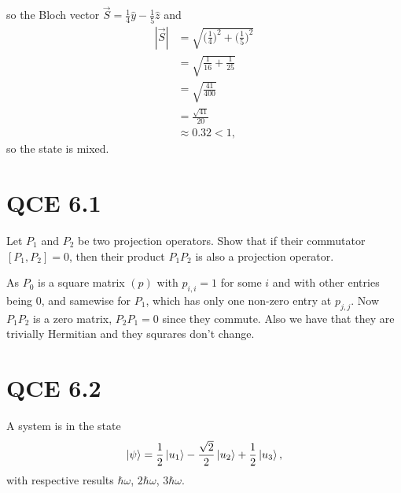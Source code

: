 \documentclass[10pt]{article}
\begin{document}
so the Bloch vector $\vec{S} = \frac{1}{4} \hat{y} - \frac{1}{5} \hat{z}$ and
\begin{align*}
|\vec{S}| &= \sqrt{\Bigg( \frac{1}{4} \Bigg)^2 + \Bigg( \frac{1}{5} \Bigg)^2} \\
              &= \sqrt{\frac{1}{16} + \frac{1}{25}} \\
              &= \sqrt{\frac{41}{400}} \\
              &= \frac{\sqrt{41}}{20} \\
              &\approx 0.32 < 1,
\end{align*}
so the state is mixed.

\section*{QCE 6.1}
Let $P_1$ and $P_2$ be two projection operators. Show that if their commutator $[P_1, P_2] = 0$, then their product $P_1 P_2$ is also a projection operator.

As $P_0$ is a square matrix $(p)$ with $p_{i, i} = 1$ for some $i$ and with other entries being 0, and samewise for $P_1$, which has only one non-zero entry at $p_{j, j}$. Now $P_1 P_2$ is a zero matrix, $P_2 P_1 = 0$ since they commute. Also we have that they are trivially Hermitian and they squrares don't change.

\section*{QCE 6.2}
A system is in the state
\[
\ket{\psi} = \frac{1}{2} \ket{u_1} - \frac{\sqrt{2}}{2} \ket{u_2} + \frac{1}{2} \ket{u_3},
\]
with respective results $\hbar \omega$, $2\hbar \omega$, $3\hbar \omega$.
\end{document}
